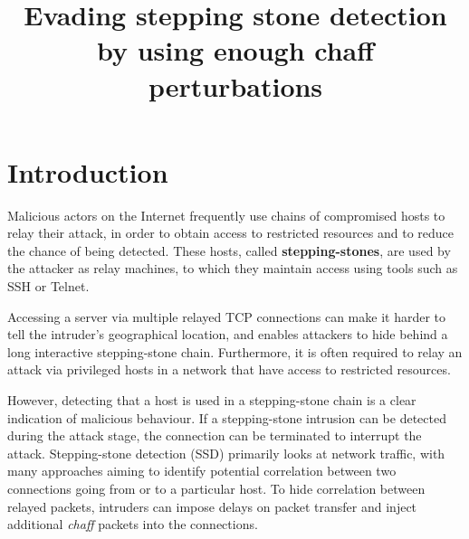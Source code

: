 \documentclass[runningheads]{llncs}\usepackage[]{graphicx}\usepackage[]{color}
\begin{document}
\title{Evading stepping stone detection by using enough chaff perturbations}



\maketitle          

\begin{abstract}

\end{abstract}



\section{Introduction}\label{Sec:Introduction}



Malicious actors on the Internet frequently use chains of compromised hosts to relay their attack, in order to obtain access to restricted resources and to reduce the chance of being detected. These hosts, called \textbf{stepping-stones}, are used by the attacker as relay machines, to which they maintain access using tools such as SSH or Telnet. 

Accessing a server via multiple relayed TCP connections can make it harder to tell the intruder's geographical location, and enables attackers to hide behind a long interactive stepping-stone chain. Furthermore, it is often required to relay an attack via privileged hosts in a network that have access to restricted resources. 

However, detecting that a host is used in a stepping-stone chain is a clear indication of malicious behaviour. If a stepping-stone intrusion can be detected during the attack stage, the connection can be terminated to interrupt the attack. Stepping-stone detection (SSD) primarily looks at network traffic, with many approaches aiming to identify potential correlation between two connections going from or to a particular host. To hide correlation between relayed packets, intruders can impose delays on packet transfer and inject additional \textit{chaff} packets into the connections.
\end{document}
